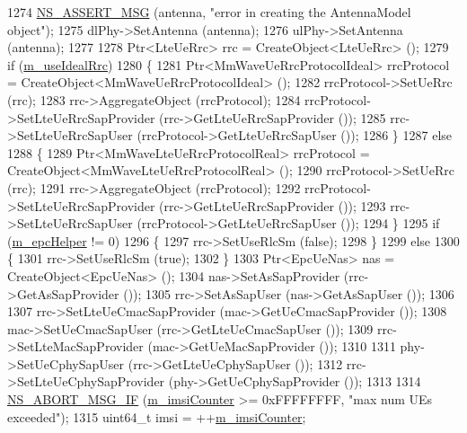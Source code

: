 \begin{DoxyCode}
1274         \hyperlink{assert_8h_aff5ece9066c74e681e74999856f08539}{NS\_ASSERT\_MSG} (antenna, \textcolor{stringliteral}{"error in creating the AntennaModel object"});
1275         dlPhy->SetAntenna (antenna);
1276         ulPhy->SetAntenna (antenna);
1277 
1278         Ptr<LteUeRrc> rrc = CreateObject<LteUeRrc> ();
1279         \textcolor{keywordflow}{if} (\hyperlink{classns3_1_1MmWaveHelper_ad41fdb2996a6f53385b146bb60f476dc}{m\_useIdealRrc})
1280         \{
1281                 Ptr<MmWaveUeRrcProtocolIdeal> rrcProtocol = CreateObject<MmWaveUeRrcProtocolIdeal> ();
1282                 rrcProtocol->SetUeRrc (rrc);
1283                 rrc->AggregateObject (rrcProtocol);
1284                 rrcProtocol->SetLteUeRrcSapProvider (rrc->GetLteUeRrcSapProvider ());
1285                 rrc->SetLteUeRrcSapUser (rrcProtocol->GetLteUeRrcSapUser ());
1286         \}
1287         \textcolor{keywordflow}{else}
1288         \{
1289                 Ptr<MmWaveLteUeRrcProtocolReal> rrcProtocol = CreateObject<MmWaveLteUeRrcProtocolReal> ();
1290                 rrcProtocol->SetUeRrc (rrc);
1291                 rrc->AggregateObject (rrcProtocol);
1292                 rrcProtocol->SetLteUeRrcSapProvider (rrc->GetLteUeRrcSapProvider ());
1293                 rrc->SetLteUeRrcSapUser (rrcProtocol->GetLteUeRrcSapUser ());
1294         \}
1295         \textcolor{keywordflow}{if} (\hyperlink{classns3_1_1MmWaveHelper_a03b33f9a2480a4cdd8ffe697ccc08e9e}{m\_epcHelper} != 0)
1296         \{
1297                 rrc->SetUseRlcSm (\textcolor{keyword}{false});
1298         \}
1299         \textcolor{keywordflow}{else}
1300         \{
1301                 rrc->SetUseRlcSm (\textcolor{keyword}{true});
1302         \}
1303         Ptr<EpcUeNas> nas = CreateObject<EpcUeNas> ();
1304         nas->SetAsSapProvider (rrc->GetAsSapProvider ());
1305         rrc->SetAsSapUser (nas->GetAsSapUser ());
1306 
1307         rrc->SetLteUeCmacSapProvider (mac->GetUeCmacSapProvider ());
1308         mac->SetUeCmacSapUser (rrc->GetLteUeCmacSapUser ());
1309         rrc->SetLteMacSapProvider (mac->GetUeMacSapProvider ());
1310 
1311         phy->SetUeCphySapUser (rrc->GetLteUeCphySapUser ());
1312         rrc->SetLteUeCphySapProvider (phy->GetUeCphySapProvider ());
1313 
1314         \hyperlink{group__fatal_ga6653324225bc139e46deea177614ceee}{NS\_ABORT\_MSG\_IF} (\hyperlink{classns3_1_1MmWaveHelper_a72100c1c951aa5dcc5b634749e2bb930}{m\_imsiCounter} >= 0xFFFFFFFF, \textcolor{stringliteral}{"max num UEs exceeded"});
1315         uint64\_t imsi = ++\hyperlink{classns3_1_1MmWaveHelper_a72100c1c951aa5dcc5b634749e2bb930}{m\_imsiCounter};

\end{DoxyCode}
